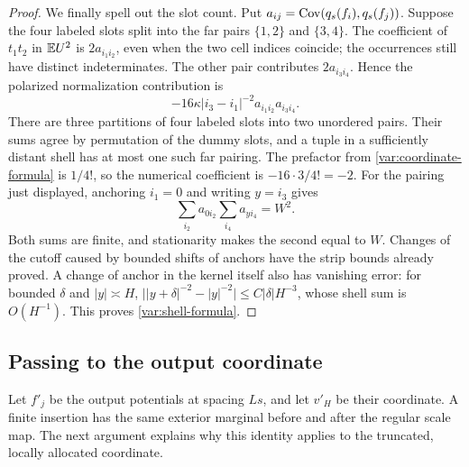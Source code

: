 \begin{proof}
We finally spell out the slot count.  Put
$a_{ij}=\operatorname{Cov}(q_s(f_i),q_s(f_j))$.  Suppose the four labeled slots
split into the far pairs $\{1,2\}$ and $\{3,4\}$.  The coefficient
of $t_1t_2$ in $\mathbb E U^2$ is $2a_{i_1i_2}$, even when the two cell
indices coincide; the occurrences still have distinct indeterminates.
The other pair contributes $2a_{i_3i_4}$.  Hence the polarized
normalization contribution is
\[
 -16\kappa |i_3-i_1|^{-2}a_{i_1i_2}a_{i_3i_4}.
\]
There are three partitions of four labeled slots into two unordered
pairs.  Their sums agree by permutation of the dummy slots, and a
tuple in a sufficiently distant shell has at most one such far
pairing.  The prefactor from \eqref{var:coordinate-formula} is
$1/4!$, so the numerical coefficient is
$-16\cdot3/4!=-2$.  For the pairing just displayed, anchoring
$i_1=0$ and writing $y=i_3$ gives
\[
 \sum_{i_2}a_{0i_2}\sum_{i_4}a_{y i_4}=W^2.
\]
Both sums are finite, and stationarity makes the second equal to $W$.
Changes of the cutoff caused by bounded shifts of anchors have the
strip bounds already proved.  A change of anchor in the kernel itself
also has vanishing error: for bounded $\delta$ and $|y|\asymp H$,
$\bigl||y+\delta|^{-2}-|y|^{-2}\bigr|\le C|\delta|H^{-3}$,
whose shell sum is $O(H^{-1})$.  This proves
\eqref{var:shell-formula}.
\end{proof}

\subsection{Passing to the output coordinate}

Let $f'_j$ be the output potentials at spacing $Ls$, and let $v'_H$
be their coordinate.  A finite insertion has the same exterior marginal
before and after the regular scale map.  The next argument explains why
this identity applies to the truncated, locally allocated coordinate.

